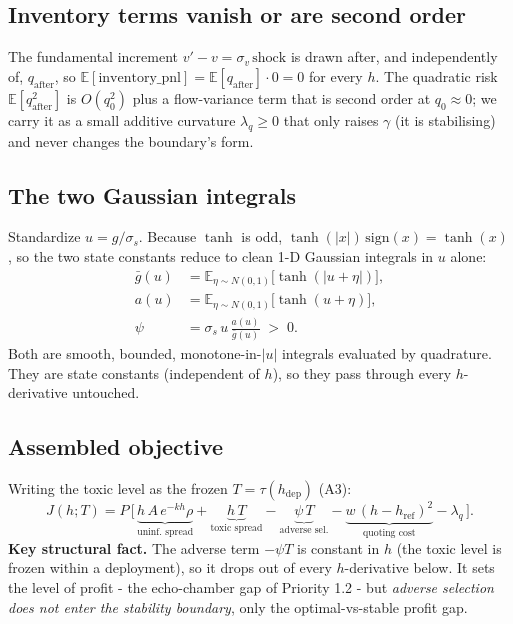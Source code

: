 \documentclass[11pt]{article}
\newcommand{\gbar}{\bar g}
\newcommand{\hdep}{h_{\mathrm{dep}}}
\newcommand{\href}{h_{\mathrm{ref}}}
\begin{document}
\subsection{Inventory terms vanish or are second order}
The fundamental increment $v'-v=\sigma_v\,\mathrm{shock}$ is drawn after, and
independently of, $q_{\mathrm{after}}$, so
$\mathbb{E}[\text{inventory\_pnl}]=\mathbb{E}[q_{\mathrm{after}}]\cdot 0=0$ for
every $h$. The quadratic risk $\mathbb{E}[q_{\mathrm{after}}^2]$ is $O(q_0^2)$
plus a flow-variance term that is second order at $q_0\approx 0$; we carry it as
a small additive curvature $\lambda_q\ge 0$ that only raises $\gamma$ (it is
stabilising) and never changes the boundary's form.

\subsection{The two Gaussian integrals}
Standardize $u=g/\sigma_s$. Because $\tanh$ is odd,
$\tanh(|x|)\,\mathrm{sign}(x)=\tanh(x)$, so the two state constants reduce to
clean 1-D Gaussian integrals in $u$ alone:
%
\begin{align*}
  \gbar(u) &= \mathbb{E}_{\eta\sim N(0,1)}\!\big[\tanh(|u+\eta|)\big], \\
  a(u)     &= \mathbb{E}_{\eta\sim N(0,1)}\!\big[\tanh(u+\eta)\big], \\
  \psi     &= \sigma_s\,u\,\frac{a(u)}{\gbar(u)} \;>\;0.
\end{align*}
%
Both are smooth, bounded, monotone-in-$|u|$ integrals evaluated by quadrature.
They are state constants (independent of $h$), so they pass through every
$h$-derivative untouched.

\subsection{Assembled objective}
Writing the toxic level as the frozen $T=\tau(\hdep)$ (A3):
%
\begin{equation}\label{eq:J}
  J(h;T) = P\,\Big[\,
    \underbrace{h\,A\,e^{-kh}\rho}_{\text{uninf.\ spread}}
    + \underbrace{h\,T}_{\text{toxic spread}}
    - \underbrace{\psi\,T}_{\text{adverse sel.}}
    - \underbrace{w\,(h-\href)^2}_{\text{quoting cost}}
    - \lambda_q \,\Big].
\end{equation}
%
\textbf{Key structural fact.} The adverse term $-\psi T$ is constant in $h$ (the
toxic level is frozen within a deployment), so it drops out of every
$h$-derivative below. It sets the level of profit - the echo-chamber gap of
Priority 1.2 - but \emph{adverse selection does not enter the stability
boundary}, only the optimal-vs-stable profit gap.
\end{document}
